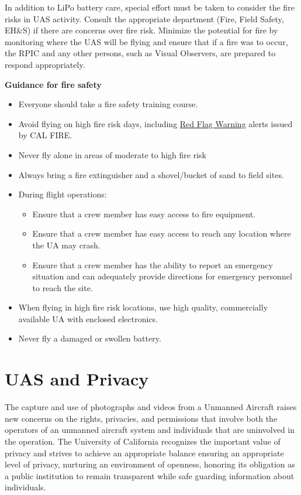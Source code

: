 \documentclass[
]{book}
\providecommand{\tightlist}{%
  \setlength{\itemsep}{0pt}\setlength{\parskip}{0pt}}
\begin{document}
In addition to LiPo battery care, special effort must be taken to consider the fire risks in UAS activity. Consult the appropriate department (Fire, Field Safety, EH\&S) if there are concerns over fire risk. Minimize the potential for fire by monitoring where the UAS will be flying and ensure that if a fire was to occur, the RPIC and any other persons, such as Visual Observers, are prepared to respond appropriately.

\textbf{Guidance for fire safety}

\begin{itemize}
\item
  Everyone should take a fire safety training course.
\item
  Avoid flying on high fire risk days, including \href{https://www.fire.ca.gov/programs/communications/red-flag-warnings-fire-weather-watches/}{Red Flag Warning} alerts issued by CAL FIRE.
\item
  Never fly alone in areas of moderate to high fire risk
\item
  Always bring a fire extinguisher and a shovel/bucket of sand to field sites.
\item
  During flight operations:

  \begin{itemize}
  \tightlist
  \item
    Ensure that a crew member has easy access to fire equipment.
  \item
    Ensure that a crew member has easy access to reach any location where the UA may crash.
  \item
    Ensure that a crew member has the ability to report an emergency situation and can adequately provide directions for emergency personnel to reach the site.
  \end{itemize}
\item
  When flying in high fire risk locations, use high quality, commercially available UA with enclosed electronics.
\item
  Never fly a damaged or swollen battery.
\end{itemize}

\hypertarget{ch-privacy}{%
\chapter{UAS and Privacy}\label{ch-privacy}}

The capture and use of photographs and videos from a Unmanned Aircraft raises new concerns on the rights, privacies, and permissions that involve both the operators of an unmanned aircraft system and individuals that are uninvolved in the operation. The University of California recognizes the important value of privacy and strives to achieve an appropriate balance ensuring an appropriate level of privacy, nurturing an environment of openness, honoring its obligation as a public institution to remain transparent while safe guarding information about individuals.
\end{document}
